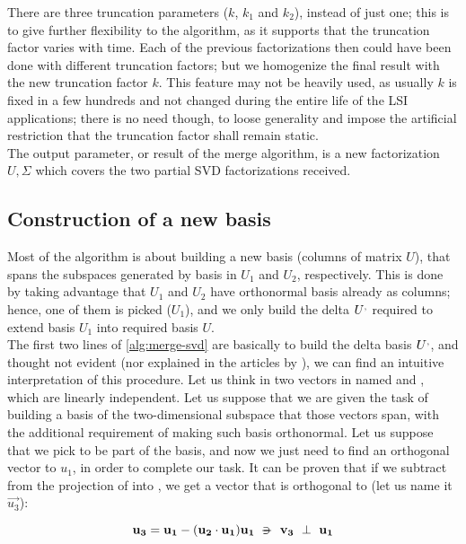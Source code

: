There are three truncation parameters ($k$, $k_1$ and $k_2$), instead of
just one; this is to give further flexibility to the algorithm, as it
supports that the truncation factor varies with time. Each of the
previous factorizations then could have been done with different
truncation factors; but we homogenize the final result with the new
truncation factor $k$. This feature may not be heavily used, as
usually $k$ is fixed in a few hundreds and not changed during the
entire life of the LSI applications; there is no need though, to loose
generality and impose the artificial restriction that the truncation
factor shall remain static. \\

The output parameter, or result of the merge algorithm, is a new
factorization $U,\Sigma$ which covers the two partial SVD
factorizations received. 

\subsection{Construction of a new basis}

Most of the algorithm is about building a new basis (columns of matrix
$U$), that spans the subspaces generated by basis in $U_1$ and $U_2$,
respectively. This is done by taking advantage that $U_1$ and $U_2$
have orthonormal basis already as columns; hence, one of them is
picked ($U_1$), and we only build the delta $\prim{U}$ required to
extend  basis $U_1$ into required basis $U$. \\

The first two lines of \cref{alg:merge-svd} are basically to build the
delta basis $\prim{U}$, and thought not evident (nor explained in the
articles by \Rehurek), we can find an intuitive interpretation of this
procedure. Let us think in two vectors in  named 
 and , which are linearly
independent. Let us suppose that we are given the task of building a
basis of the two-dimensional subspace that those vectors span, with
the additional requirement of making such basis orthonormal. Let us
suppose that we pick  to be part of the basis, and now we
just need to find an orthogonal vector to $u_1$, in order to complete our
task. It can be proven that if we subtract from 
 the projection of  into , we get a vector
that is orthogonal to  (let us name it $\vec{u_3}$):

\[
\vec{u_3} = \vec{u_1} - (\vec{u_2} \cdot \vec{u_1}) \vec{u_1} \suchthat
\vec{v_3} \ds{\perp} \vec{u_1}
\]
\hfill

